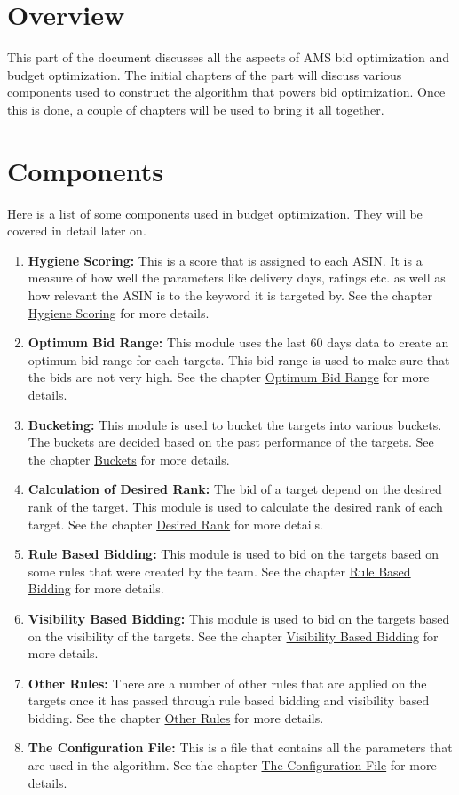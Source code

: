 \section{Overview}
This part of the document discusses all the aspects of AMS bid optimization and budget optimization. The initial chapters of the part will discuss various components used to construct the algorithm that powers bid optimization. Once this is done, a couple of chapters will be used to bring it all together.

\section{Components}

Here is a list of some components used in budget optimization. They will be covered in detail later on.

\begin{enumerate}
    \item \textbf{Hygiene Scoring:} This is a score that is assigned to each ASIN. It is a measure of how well the parameters like delivery days, ratings etc. as well as how relevant the ASIN is to the keyword it is targeted by. See the chapter \hyperref[ch:hygiene]{Hygiene Scoring} for more details.
    \item \textbf{Optimum Bid Range:} This module uses the last 60 days data to create an optimum bid range for each targets. This bid range is used to make sure that the bids are not very high. See the chapter \hyperref[ch:bid_range]{Optimum Bid Range} for more details.
    \item \textbf{Bucketing:} This module is used to bucket the targets into various buckets. The buckets are decided based on the past performance of the targets. See the chapter \hyperref[ch:buckets]{Buckets} for more details.
    \item \textbf{Calculation of Desired Rank:} The bid of a target depend on the desired rank of the target. This module is used to calculate the desired rank of each target. See the chapter \hyperref[ch:desired_rank]{Desired Rank} for more details.
    \item \textbf{Rule Based Bidding:} This module is used to bid on the targets based on some rules that were created by the team. See the chapter \hyperref[ch:rule_based_bids]{Rule Based Bidding} for more details.
    \item \textbf{Visibility Based Bidding:} This module is used to bid on the targets based on the visibility of the targets. See the chapter \hyperref[ch:visibility_bids]{Visibility Based Bidding} for more details.
    \item \textbf{Other Rules:} There are a number of other rules that are applied on the targets once it has passed through rule based bidding and visibility based bidding. See the chapter \hyperref[ch:other_rules]{Other Rules} for more details.
    \item \textbf{The Configuration File:} This is a file that contains all the parameters that are used in the algorithm. See the chapter \hyperref[ch:config_file]{The Configuration File} for more details.
\end{enumerate}

